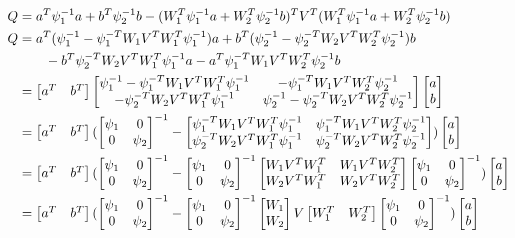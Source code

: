 \documentclass[11pt]{article}
\newcommand{\ps}{\begin{bmatrix} \psi_1 & 0 \\ 0 & \psi_2 \end{bmatrix}}
\begin{document}
\begin{align}
  Q &= a^T\psi_1^{-1}a + b^T\psi_2^{-1}b - (W_1^T\psi_1^{-1}a +
  W_2^T\psi_2^{-1}b)^T V^T(W_1^T\psi_1^{-1}a + W_2^T\psi_2^{-1}b)\\
  Q &= a^T(\psi_1^{-1} - \psi_1^{-T}W_1V^TW_1^T \psi_1^{-1}) a +
  b^T(\psi_2^{-1} - \psi_2^{-T}W_2V^TW_2^T \psi_2^{-1}) b  \notag\\
  & \qquad - b^T\psi_2^{-T}W_2V^TW_1^T\psi_1^{-1}a -
  a^T\psi_1^{-T}W_1V^TW_2^T\psi_2^{-1}b\\
  &= \begin{bmatrix} a^T & b^T \end{bmatrix}
    \begin{bmatrix}
       \psi_1^{-1} - \psi_1^{-T}W_1V^TW_1^T \psi_1^{-1} & -\psi_1^{-T}W_1V^TW_2^T\psi_2^{-1} \\
       -\psi_2^{-T}W_2V^TW_1^T\psi_1^{-1}  & \psi_2^{-1} -\psi_2^{-T}W_2V^TW_2^T\psi_2^{-1}  \end{bmatrix}
    \begin{bmatrix}a    \\ b \end{bmatrix}\\
    &= \begin{bmatrix} a^T & b^T \end{bmatrix}
    (\ps^{-1} - \begin{bmatrix}
        \psi_1^{-T}W_1V^TW_1^T \psi_1^{-1} & \psi_1^{-T}W_1V^TW_2^T\psi_2^{-1} \\
       \psi_2^{-T}W_2V^TW_1^T\psi_1^{-1}  & \psi_2^{-T}W_2V^TW_2^T\psi_2^{-1}  \end{bmatrix})
    \begin{bmatrix}a    \\ b \end{bmatrix}\\
    &= \begin{bmatrix} a^T & b^T \end{bmatrix}
    (\ps^{-1} - \ps^{-1} \begin{bmatrix}
        W_1V^TW_1^T  & W_1V^TW_2^T \\
       W_2V^TW_1^T  & W_2V^TW_2^T  \end{bmatrix}\ps^{-1})
    \begin{bmatrix}a    \\ b \end{bmatrix} \\
    &= \begin{bmatrix} a^T & b^T \end{bmatrix}
    (\ps^{-1} - \ps^{-1}
    \begin{bmatrix} W_1 \\ W_2 \end{bmatrix}
    V
    \begin{bmatrix} W_1^T & W_2^T \end{bmatrix}
    \ps^{-1})
    \begin{bmatrix}a    \\ b \end{bmatrix}
\end{align}
\end{document}
